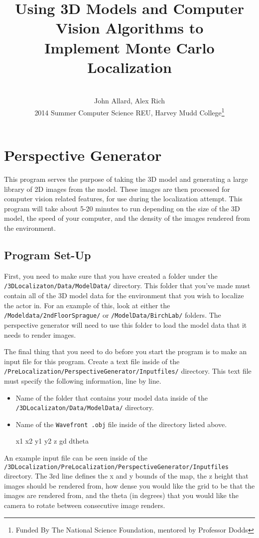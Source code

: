 \documentclass[a4paper,11pt]{article}
\title{Using 3D Models and Computer Vision Algorithms to \\ Implement Monte Carlo Localization}
\author{ \\[7in]  John Allard, Alex Rich \\ 2014 Summer Computer Science REU, Harvey Mudd College\thanks{Funded By The National Science Foundation, mentored by Professor Dodds}}
\begin{document}
\section{Perspective Generator}
 This program serves the purpose of taking the 3D model and generating a large library of 2D images from the model. These images are then processed for computer vision related features, for use during the localization attempt. This program will take about 5-20 minutes to run depending on the size of the 3D model, the speed of your computer, and the density of the images rendered from the environment.
 \subsection{Program Set-Up}
 First, you need to make sure that you have created a folder under the \texttt{/3DLocalizaton/Data/ModelData/} directory. This folder that you've made must contain all of the 3D model data for the environment that you wish to localize the actor in. For an example of this, look at either the \texttt{/Modeldata/2ndFloorSprague/} or \texttt{/ModelData/BirchLab/} folders. The perspective generator will need to use this folder to load the model data that it needs to render images. 

 The final thing that you need to do before you start the program is to make an input file for this program. Create a text file inside of the \texttt{/PreLocalization/PerspectiveGenerator/Inputfiles/} directory. This text file must specify the following information, line by line.

 \begin{itemize}
 \item Name of the folder that contains your model data inside of the  \texttt{/3DLocalizaton/Data/ModelData/} directory.
 \item Name of the \texttt{Wavefront .obj} file inside of the directory listed above.
 \item [x1 x2 y1 y2 z gd dtheta]
 \end{itemize}

 An example input file can be seen inside of the \texttt{/3DLocalization/PreLocalization/PerspectiveGenerator/Inputfiles} directory. The 3rd line defines the x and y bounds of the map, the z height that images should be rendered from, how dense you would like the grid to be that the images are rendered from, and the theta (in degrees) that you would like the camera to rotate between consecutive image renders.
\end{document}
